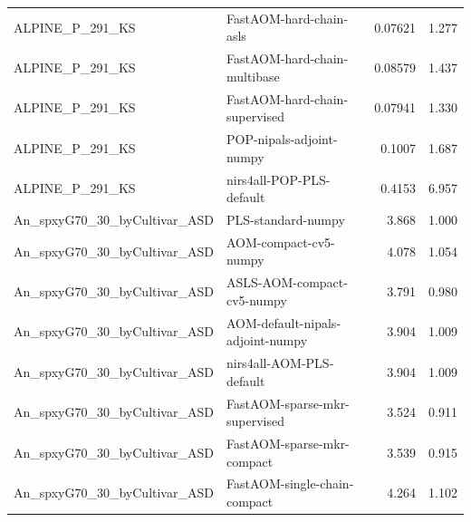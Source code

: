 \begin{landscape}
\begin{longtable}{L{8.0cm}L{9.5cm}rr}
ALPINE\_\allowbreak{}P\_\allowbreak{}291\_\allowbreak{}KS & FastAOM-\allowbreak{}hard-\allowbreak{}chain-\allowbreak{}asls & 0.07621 & 1.277 \\
ALPINE\_\allowbreak{}P\_\allowbreak{}291\_\allowbreak{}KS & FastAOM-\allowbreak{}hard-\allowbreak{}chain-\allowbreak{}multibase & 0.08579 & 1.437 \\
ALPINE\_\allowbreak{}P\_\allowbreak{}291\_\allowbreak{}KS & FastAOM-\allowbreak{}hard-\allowbreak{}chain-\allowbreak{}supervised & 0.07941 & 1.330 \\
ALPINE\_\allowbreak{}P\_\allowbreak{}291\_\allowbreak{}KS & POP-\allowbreak{}nipals-\allowbreak{}adjoint-\allowbreak{}numpy & 0.1007 & 1.687 \\
ALPINE\_\allowbreak{}P\_\allowbreak{}291\_\allowbreak{}KS & nirs4all-\allowbreak{}POP-\allowbreak{}PLS-\allowbreak{}default & 0.4153 & 6.957 \\
An\_\allowbreak{}spxyG70\_\allowbreak{}30\_\allowbreak{}byCultivar\_\allowbreak{}ASD & PLS-\allowbreak{}standard-\allowbreak{}numpy & 3.868 & 1.000 \\
An\_\allowbreak{}spxyG70\_\allowbreak{}30\_\allowbreak{}byCultivar\_\allowbreak{}ASD & AOM-\allowbreak{}compact-\allowbreak{}cv5-\allowbreak{}numpy & 4.078 & 1.054 \\
An\_\allowbreak{}spxyG70\_\allowbreak{}30\_\allowbreak{}byCultivar\_\allowbreak{}ASD & ASLS-\allowbreak{}AOM-\allowbreak{}compact-\allowbreak{}cv5-\allowbreak{}numpy & 3.791 & 0.980 \\
An\_\allowbreak{}spxyG70\_\allowbreak{}30\_\allowbreak{}byCultivar\_\allowbreak{}ASD & AOM-\allowbreak{}default-\allowbreak{}nipals-\allowbreak{}adjoint-\allowbreak{}numpy & 3.904 & 1.009 \\
An\_\allowbreak{}spxyG70\_\allowbreak{}30\_\allowbreak{}byCultivar\_\allowbreak{}ASD & nirs4all-\allowbreak{}AOM-\allowbreak{}PLS-\allowbreak{}default & 3.904 & 1.009 \\
An\_\allowbreak{}spxyG70\_\allowbreak{}30\_\allowbreak{}byCultivar\_\allowbreak{}ASD & FastAOM-\allowbreak{}sparse-\allowbreak{}mkr-\allowbreak{}supervised & 3.524 & 0.911 \\
An\_\allowbreak{}spxyG70\_\allowbreak{}30\_\allowbreak{}byCultivar\_\allowbreak{}ASD & FastAOM-\allowbreak{}sparse-\allowbreak{}mkr-\allowbreak{}compact & 3.539 & 0.915 \\
An\_\allowbreak{}spxyG70\_\allowbreak{}30\_\allowbreak{}byCultivar\_\allowbreak{}ASD & FastAOM-\allowbreak{}single-\allowbreak{}chain-\allowbreak{}compact & 4.264 & 1.102 \\

\end{longtable}
\end{landscape}
